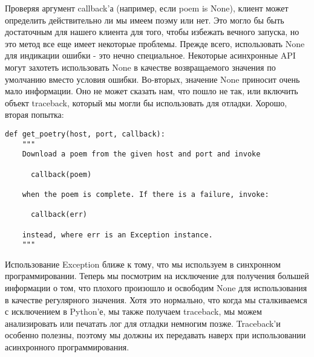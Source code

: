
Проверяя аргумент callback'а (например, если poem is None), 
клиент может определить действительно ли мы имеем поэму или нет. 
Это могло бы быть достаточным для нашего клиента для того, чтобы 
избежать вечного запуска, но это метод все еще имеет 
некоторые проблемы. Прежде всего, использовать None для индикации 
ошибки - это нечно специальное. Некоторые асинхронные API могут 
захотеть использовать None в качестве возвращаемого 
значения по умолчанию вместо условия ошибки. Во-вторых, значение None 
приносит очень мало информации. Оно не может сказать нам, что пошло 
не так, или включить объект traceback, который мы могли бы 
использовать для отладки. Хорошо, вторая попытка:

 \begin{verbatim}
def get_poetry(host, port, callback):
    """
    Download a poem from the given host and port and invoke

      callback(poem)

    when the poem is complete. If there is a failure, invoke:

      callback(err)

    instead, where err is an Exception instance.
    """
\end{verbatim} 


Использование Exception ближе к тому, что 
мы используем в синхронном программировании. Теперь 
мы посмотрим на исключение для получения большей информации 
о том, что плохого произошло и освободим None 
для использования в качестве регулярного значения. Хотя это нормально, 
что когда мы сталкиваемся с исключением в Python'е, 
мы также получаем traceback, мы можем анализировать или печатать 
лог для отладки немногим позже. Traceback'и особенно полезны, поэтому 
мы должны их передавать наверх при использовании 
асинхронного программирования.

